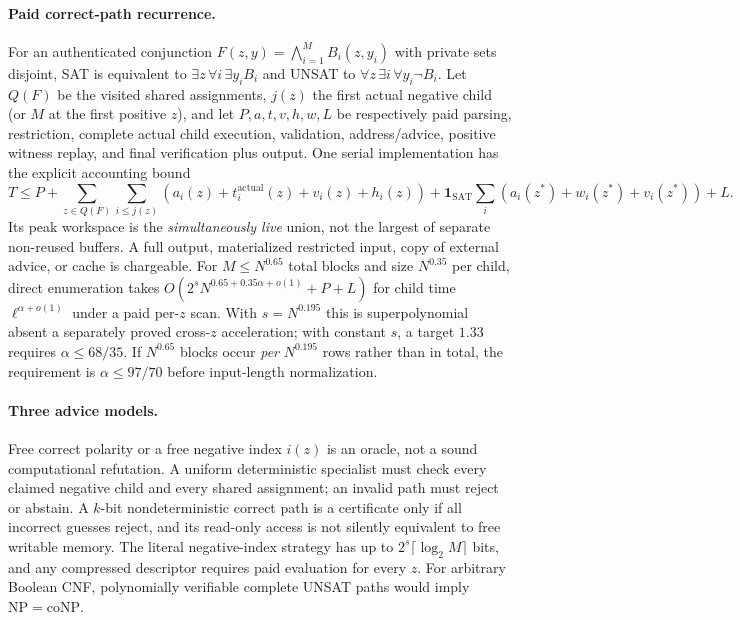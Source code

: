 \documentclass[11pt]{article}
\begin{document}
\paragraph{Paid correct-path recurrence.}
For an authenticated conjunction
$F(z,y)=\bigwedge_{i=1}^M B_i(z,y_i)$ with private sets disjoint,
SAT is equivalent to $\exists z\,\forall i\,\exists y_i B_i$
and UNSAT to $\forall z\,\exists i\,\forall y_i\neg B_i$.
Let $Q(F)$ be the visited shared assignments, $j(z)$ the first
actual negative child (or $M$ at the first positive $z$), and let
$P,a,t,v,h,w,L$ be respectively paid parsing, restriction,
complete actual child execution, validation, address/advice,
positive witness replay, and final verification plus output.
One serial implementation has the explicit accounting bound
\[
T \le P+
\sum_{z\in Q(F)}\sum_{i\le j(z)}
       (a_i(z)+t_i^{\mathrm{actual}}(z)+v_i(z)+h_i(z))
+\mathbf1_{\mathrm{SAT}}\sum_i
       (a_i(z^*)+w_i(z^*)+v_i(z^*))+L.
\]
Its peak workspace is the \emph{simultaneously live} union, not
the largest of separate non-reused buffers. A full output,
materialized restricted input, copy of external advice, or cache
is chargeable. For $M\le N^{0.65}$ total blocks and size
$N^{0.35}$ per child, direct enumeration takes
$O(2^s N^{0.65+0.35\alpha+o(1)}+P+L)$ for
child time $\ell^{\alpha+o(1)}$ under a paid per-$z$ scan.
With $s=N^{0.195}$ this is superpolynomial absent a separately
proved cross-$z$ acceleration; with constant $s$, a target $1.33$
requires $\alpha\le68/35$.
If $N^{0.65}$ blocks occur \emph{per} $N^{0.195}$ rows rather
than in total, the requirement is $\alpha\le 97/70$ before
input-length normalization.

\paragraph{Three advice models.}
Free correct polarity or a free negative index $i(z)$ is an oracle,
not a sound computational refutation. A uniform deterministic
specialist must check every claimed negative child and every
shared assignment; an invalid path must reject or abstain. A
$k$-bit nondeterministic correct path is a certificate only if all
incorrect guesses reject, and its read-only access is not silently
equivalent to free writable memory. The literal negative-index
strategy has up to $2^s\lceil\log_2 M\rceil$ bits, and any compressed
descriptor requires paid evaluation for every $z$.
For arbitrary Boolean CNF, polynomially verifiable complete UNSAT
paths would imply $\mathrm{NP}=\mathrm{coNP}$.
\end{document}
